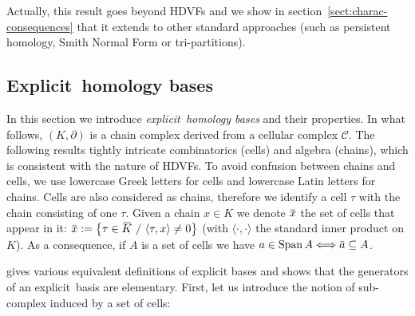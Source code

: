\documentclass[runningheads]{llncs}
\let\Oldsubsection\subsection
\renewcommand{\subsection}{\FloatBarrier\Oldsubsection}
\newcommand\Span{\mathrm{Span}\,}
\newcommand{\cplx}{{(K,\partial)} }
\newcommand{\ols}[1]{\mskip.5\thinmuskip\overline{\mskip-.5\thinmuskip {#1} \mskip-.5\thinmuskip}\mskip.5\thinmuskip} %
\newcommand{\explicit}{explicit}
\newcommand{\Explicit}{Explicit}
\newcommand{\HC}{HDVF}
\newcommand{\HCs}{HDVFs}
\newcommand{\equi}{\Longleftrightarrow}
\newcommand{\add}[1]{{#1}}%
\begin{document}
    Actually, this result goes beyond HDVFs and we show in section~\ref{sect:charac-consequences} that it extends to other standard approaches (such as persistent homology, Smith Normal Form or tri-partitions).
    
    

\subsection{\Explicit\ homology bases}
    In this section we  introduce \textit{\explicit\ homology bases} and their properties.
    In what follows, $\cplx$ is a chain complex derived from a cellular complex $\mathscr C$.
    \add{The following results tightly intricate combinatorics (cells) and algebra (chains), which is consistent with the nature of \HCs.} 
    To avoid confusion between chains and cells, we use lowercase Greek letters for cells and lowercase Latin letters for chains.
    Cells are also considered as chains, therefore we identify a cell $\tau$ with the chain consisting of one $\tau$.
    Given a chain $x \in K$ we denote $\ols x$ the set of cells that appear in it: $\ols x := \left\{ \tau\in \ols K \ /\ \langle \tau, x \rangle \neq 0 \right\}$ (with $\langle \cdot, \cdot \rangle$ the standard inner product on $K$).
    As a consequence, if $A$ is a set of cells we have $a\in\Span A \equi \ols{a} \subseteq A$.
    
     gives various equivalent definitions of explicit bases and  shows that the generators of an \explicit\ basis are elementary.
    First, let us introduce the notion of sub-complex induced by a set of cells:
\end{document}
